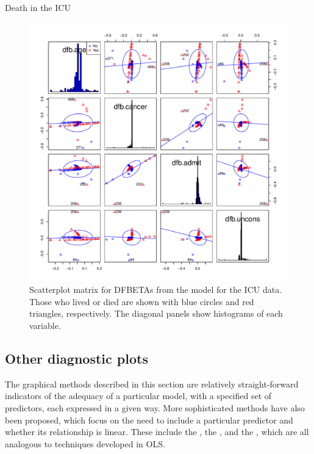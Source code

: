 \documentclass[11pt]{book}\usepackage[]{graphicx}\usepackage[]{color}
\newenvironment{knitrout}{}{} %
\renewenvironment{knitrout}{\small\renewcommand{\baselinestretch}{.85}}{} %
\begin{document}
\begin{Example}[icu2]{Death in the ICU}
\begin{knitrout}
\begin{figure}[!htbp]
\centerline{\includegraphics[width=.85\textwidth]{ch07/fig/icu2-dbscatmat-1} }

\caption[Scatterplot matrix for DFBETAs from the model for the ICU data]{Scatterplot matrix for DFBETAs from the model for the ICU data. Those who lived or died are shown with blue circles and red triangles, respectively. The diagonal panels show histograms of each variable.\label{fig:icu2-dbscatmat}}
\end{figure}


\end{knitrout}


\end{Example}

\subsection{Other diagnostic plots}\label{sec:logist-partial}

The graphical methods described in this section are relatively
straight-forward indicators of the adequacy of a particular model,
with a specified set of predictors, each expressed in a given way.
More sophisticated methods have also been proposed, which focus on the need to include a particular predictor and whether its relationship is linear.
These include the , the
, and the
,
which are all analogous to techniques developed in OLS.
\end{document}
